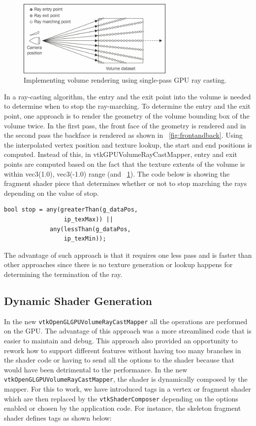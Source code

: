 \begin{figure}
\centering
\includegraphics[width=3in]{raycasting.jpg}
\caption{Implementing volume rendering using single-pass GPU ray casting.}
\label{fig:raycasting}
\end{figure}

In a ray-casting algorithm, the entry and the exit point into the volume is
needed to determine when to stop the ray-marching. To determine the entry and
the exit point, one approach is to render the geometry of the volume bounding
box of the volume twice. In the first pass, the front face of the geometry is
rendered and in the second pass the backface is rendered as shown in
~\ref{fig:frontandback}. Using the interpolated vertex position and texture
lookup, the start and end positions is computed. Instead of this, in
vtkGPUVolumeRayCastMapper, entry and exit points are computed based on the fact
that the texture extents of the volume is within vec3(1.0), vec3(-1.0) range
(and ~\ref{fig:raycasting}). The code below is showing the fragment shader piece
that determines whether or not to stop marching the rays depending on the value
of stop.
 
 \begin{lstlisting}[breaklines=true]
 bool stop = any(greaterThan(g_dataPos, 
                 ip_texMax)) ||
             any(lessThan(g_dataPos, 
                 ip_texMin));
 \end{lstlisting}
 
 The advantage of such approach is that it requires one less pass and is faster than other approaches since there is no texture generation or lookup happens for determining the termination of the ray.
 
 
\subsection{Dynamic Shader Generation}
In the new \texttt{vtkOpenGLGPUVolumeRayCastMapper} all the operations are
performed on the GPU. The advantage of this approach was a more streamlined code
that is easier to maintain and debug. This approach also provided an opportunity
to rework how to support different features without having too many branches in
the shader code or having to send all the options to the shader because that
would have been detrimental to the performance. In the new
\texttt{vtkOpenGLGPUVolumeRayCastMapper}, the shader is dynamically composed by
the mapper. For this to work, we have introduced tags in a vertex or fragment
shader which are then replaced by the \texttt{vtkShaderComposer} depending on
the options enabled or chosen by the application code. For instance, the
skeleton fragment shader defines tags as shown below:
 
